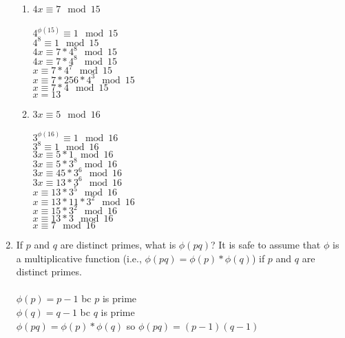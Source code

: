 \documentclass[]{article}
\begin{document}
\begin{enumerate}
\begin{enumerate}
        
        
        \item $4x \equiv 7 \mod 15$
        \\\\$4^{\phi(15)} \equiv 1 \mod 15$
        \\$4^8 \equiv 1 \mod 15$
        \\$4x \equiv 7 * 4^8 \mod 15$
        \\$4x \equiv 7 * 4^8 \mod 15$
        \\$x \equiv 7 * 4^7 \mod 15$
        \\$x \equiv 7 * 256 * 4^3 \mod 15$
        \\$x \equiv 7 * 4 \mod 15$
        \\$x = 13$
        
        \item $3x \equiv 5 \mod 16$
        \\\\$3^{\phi(16)} \equiv 1 \mod 16$
        \\$3^8 \equiv 1 \mod 16$
        \\$3x \equiv 5*1 \mod 16$
        \\$3x \equiv 5*3^8 \mod 16$
        \\$3x \equiv 45*3^6 \mod 16$
        \\$3x \equiv 13*3^6 \mod 16$
        \\$x \equiv 13*3^5 \mod 16$
        \\$x \equiv 13*11*3^2 \mod 16$
        \\$x \equiv 15*3^2 \mod 16$
        \\$x \equiv 13*3 \mod 16$
        \\$x \equiv 7 \mod 16$      
    \end{enumerate}

    \item  If $p$ and $q$ are distinct primes, what is $\phi(pq)$? It is safe to assume that $\phi$ is a multiplicative function (i.e., $\phi(pq)=\phi(p)*\phi(q)$) if $p$ and $q$ are distinct primes.
    \\\\$\phi(p)=p-1$ bc $p$ is prime
    \\$\phi(q)=q-1$ bc $q$ is prime
    \\$\phi(pq)=\phi(p)*\phi(q)$ so $\phi(pq)=(p-1)(q-1)$

    
\end{enumerate}
\end{document}
